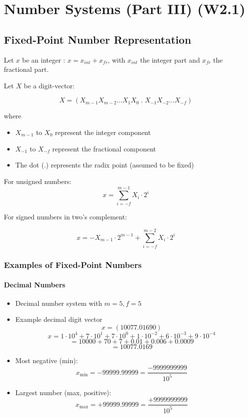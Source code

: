 \documentclass[12pt,openany]{book}
\begin{document}
		
		
		
		\chapter{Number Systems (Part III) (W2.1)}
		\section{Fixed-Point
		Number Representation}  
		
		Let \(x\) be an integer :
		$x  = x_{int} + x_{fr}$, with $x_{int}$ the integer part and $x_{fr}$ the fractional part.
		
		Let \( X \) be a digit-vector:
		
		\[ X = (X_{m-1} X_{m-2} \dots X_1 X_0 \; . \;  X_{-1} X_{-2} \dots X_{-f}) \]
		
		where
		\begin{itemize}
			\item[] \( X_{m-1} \) to \( X_0 \) represent the integer component
			\item[] \( X_{-1} \) to \( X_{-f} \) represent the fractional component
			\item[] The dot (.) represents the radix point (assumed to be fixed)
		\end{itemize}
		\vskip 0.5cm
		For unsigned numbers:
		\[ x = \sum_{i=-f}^{m-1} X_i \cdot 2^i \]
		
		\vskip 0.5cm
		For signed numbers in two's complement:
		
		\[ x = -X_{m-1} \cdot 2^{m-1} + \sum_{i=-f}^{m-2} X_i \cdot 2^i \]
		
		\newpage
		\subsection{Examples of Fixed-Point Numbers}
		\subsubsection{ Decimal Numbers}
		
		\begin{itemize}
			\item[] Decimal number system with \( m = 5, f = 5 \)
			\item[] Example decimal digit vector
			      \[
			      	x = (10077.01690)
			      \]
			      \[
			      	x = 1 \cdot 10^4 + 7 \cdot 10^1 + 7 \cdot 10^0 + 1 \cdot 10^{-2} + 6 \cdot 10^{-3} + 9 \cdot 10^{-4}
			      \]
			      \[
			      	= 10000 + 70 + 7 + 0.01 + 0.006 + 0.0009
			      \]
			      \[
			      	= 10077.0169
			      \]
			\item[] Most negative (min):
			      \[
			      	x_{\text{min}} = -99999.99999 = \frac{-9999999999}{10^5}
			      \]
			\item[] Largest number (max, positive):
			      \[
			      	x_{\text{max}} = +99999.99999 = \frac{+9999999999}{10^5}
			      \]
		\end{itemize}
		
\end{document}
